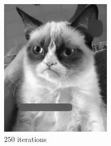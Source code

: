 \documentclass{paper}
\begin{document}
\begin{figure}[H]
\vspace{3mm}
\begin{subfigure}[ht]{0.3\textwidth}
	\centering
	\includegraphics[width=\textwidth]{result-cat-lambda100-theta0_5-iter250}
	\caption*{$250$ iterations}
\end{subfigure}
~
\begin{subfigure}[ht]{0.3\textwidth}
	\centering

\end{subfigure}
\end{figure}
\end{document}
